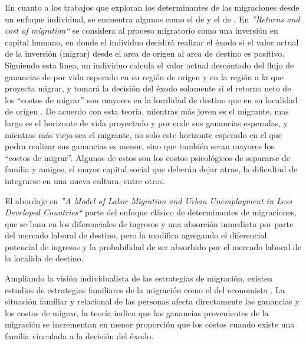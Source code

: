 \documentclass[12pt,a4paper]{article}
\begin{document}
En cuanto a los trabajos que exploran los determinantes de las migraciones desde un enfoque individual, se encuentra algunos como el de \textcite{sjaastad_costs_1962} y el de \textcite{todaro_model_1969}. En \textit{''Returns and cost of migration``}\parencite{sjaastad_costs_1962} se considera al proceso migratorio como una inversión en capital humano, en donde el individuo decidirá realizar el éxodo si el valor actual de la inversión (migrar) desde el area de origen al area de destino es positivo.  Siguiendo esta linea, un individuo calcula el valor actual descontado del flujo de ganancias de por vida esperado en su región de origen y en la región a la que proyecta migrar, y tomará la decisión del éxodo solamente si el retorno neto de los ``costos de migrar'' son mayores en la localidad de destino que en su localidad de origen \parencite{zaiceva_impact_2014}. De acuerdo con esta teoría, mientras más joven es el migrante, mas largo es el horizonte de vida proyectado y por ende sus ganancias esperadas, y mientras más viejo sea el migrante, no solo este horizonte esperado en el que podra realizar sus ganancias es menor, sino que también seran mayores  los ``costos de migrar''. Algunos de estos son los costos psicológicos de separarse de familia y amigos, el mayor capital social que deberán dejar atras, la dificultad de integrarse en una nueva cultura, entre otros.

El abordaje en \textit{''A Model of Labor Migration and Urban Unemployment in Less Developed Countries``} \parencite{todaro_model_1969} parte del enfoque clásico de determinantes de migraciones, que se basa en los diferenciales de ingresos y una absorción inmediata por parte del mercado laboral de destino, pero la modifica agregando el diferencial potencial de ingresos y la probabilidad de ser absorbido por el mercado laboral de la localida de destino. 

Ampliando la visión individualista de las estrategias de migración, existen estudios de estrategias familiares de la migración como el del economista \textcite{mincer_family_1978}. La situación familiar y relacional de las personas afecta directamente las ganancias y los costos de migrar, la teoría indica que las ganancias provenientes de la migración se incrementan en menor proporción que los costos cuando existe una familia vinculada a la decisión del éxodo. 
\end{document}
